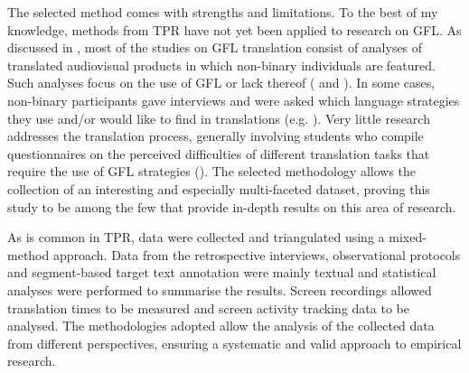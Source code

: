 
The selected method comes with strengths and limitations. To the best of my knowledge, methods from TPR have not yet been applied to research on GFL. As discussed in \textcite{nettt2022}, most of the studies on GFL translation consist of analyses of translated audiovisual products in which non-binary individuals are featured. Such analyses focus on the use of GFL or lack thereof (\cite{lopez2022trans} and \cite{misiek2020misgendered}). In some cases, non-binary participants gave interviews and were asked which language strategies they use and/or would like to find in translations (e.g. \cite{vsincek2020ona}). Very little research addresses the translation process, generally involving students who compile questionnaires on the perceived difficulties of different translation tasks that require the use of GFL strategies (\cite{bailach2021como}). The selected methodology allows the collection of an interesting and especially multi-faceted dataset, proving this study to be among the few that provide in-depth results on this area of research.

As is common in TPR, data were collected and triangulated using a mixed-method approach. Data from the retrospective interviews, observational protocols and segment-based target text annotation were mainly textual and statistical analyses were performed to summarise the results. Screen recordings allowed translation times to be measured and screen activity tracking data to be analysed. The methodologies adopted allow the analysis of the collected data from different perspectives, ensuring a systematic and valid approach to empirical research.



